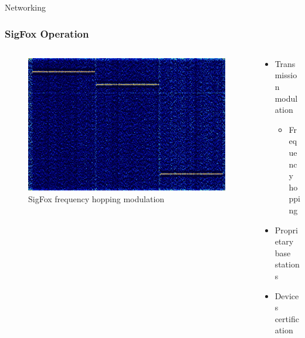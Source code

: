 \documentclass{beamer}
\begin{document}
  \begin{frame}{Networking}
    \frametitle{SigFox Operation}
    \begin{columns}
      \begin{column}{0.5\textwidth}
        \begin{figure}[htbp]
          \centering
          \includegraphics[width=\textwidth]{images/Sigfox_Spectrum_Analysis.jpg}
          \caption{SigFox frequency hopping modulation \cite{SIGFOXsignalwiki}}
          \label{fig:SigFox_Spectrum}
        \end{figure}
      \end{column}
      \begin{column}{0.5\textwidth}
        \begin{itemize}
          \item Transmission modulation
          \begin{itemize}
            \item Frequency hopping
          \end{itemize}
          \item Proprietary base stations
          \item Devices certification
        \end{itemize}
      \end{column}
    \end{columns}
  \end{frame}
\end{document}
